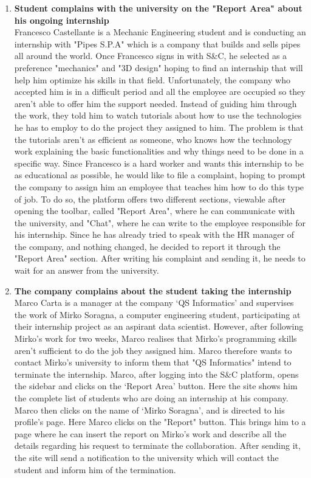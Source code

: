 \begin{enumerate}
      \item \textbf{Student complains with the university on the "Report Area" about his ongoing internship}\\
      Francesco Castellante is a Mechanic Engineering student and is conducting an internship with "Pipes S.P.A" which is a company that builds and sells pipes all around the world. Once Francesco signs in with S\&C, he selected as a preference "mechanics" and "3D design" hoping to find an internship that will help him optimize his skills in that field. Unfortunately, the company who accepted him is in a difficult period and all the employee are occupied so they aren't able to offer him the support needed. Instead of guiding him through the work, they told him to watch tutorials about how to use the technologies he has to employ to do the project they assigned to him. The problem is that the tutorials aren't as efficient as someone, who knows how the technology work explaining the basic functionalities and why things need to be done in a specific way. Since Francesco is a hard worker and wants this internship to be as educational as possible, he would like to file a complaint, hoping to prompt the company to assign him an employee that teaches him how to do this type of job. To do so, the platform offers two different sections, viewable after opening the toolbar, called "Report Area", where he can communicate with the university, and "Chat", where he can write to the employee responsible for his internship. Since he has already tried to speak with the HR manager of the company, and nothing changed, he decided to report it through the "Report Area" section. After writing his complaint and sending it, he needs to wait for an answer from the university.
      
      \item \textbf{The company complains about the student taking the internship}\\
      Marco Carta is a manager at the company ‘QS Informatics’ and supervises the work of Mirko Soragna, a computer engineering student, participating at their internship project as an aspirant data scientist. However, after following Mirko's work for two weeks, Marco realises that Mirko's programming skills aren't sufficient to do the job they assigned him. Marco therefore wants to contact Mirko's university to inform them that "QS Informatics" intend to terminate the internship. Marco, after logging into the S\&C platform, opens the sidebar and clicks on the ‘Report Area’ button. Here the site shows him the complete list of students who are doing an internship at his company. Marco then clicks on the name of ‘Mirko Soragna’, and is directed to his profile's page. Here Marco clicks on the "Report" button. This brings him to a page where he can insert the report on Mirko's work and describe all the details regarding his request to terminate the collaboration. After sending it, the site will send a notification to the university which will contact the student and inform him of the termination.
      
\end{enumerate}

